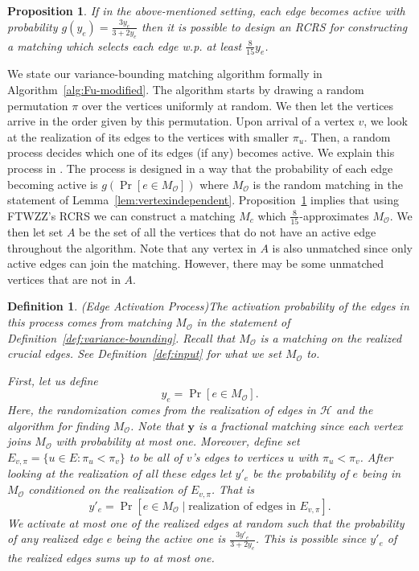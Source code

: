 \documentclass[letterpaper,11pt]{article}
\newcommand{\mc}[1]{\ensuremath{\mathcal{#1}}}
\newtheorem{proposition}[lemma]{Proposition}
\newtheorem{definition}[lemma]{Definition}
\renewcommand{\mc}[1]{\ensuremath{\mathcal{#1}}}
\begin{document}
\begin{proposition}\label{prop:fu}
   If in the above-mentioned setting, each edge becomes active with probability $g(y_e)=\frac{3y_e}{3+2y_e}$ then it is possible to design an RCRS for constructing a matching which selects each edge w.p. at least $\frac{8}{15}y_e$.
\end{proposition}


We state our variance-bounding matching algorithm formally in Algorithm~\ref{alg:Fu-modified}. The  algorithm starts by drawing a  random permutation $\pi$ over the vertices uniformly at random. We then let the vertices arrive in the order given by this permutation. Upon arrival of a vertex $v$, we look at the realization of its edges to the vertices with smaller $\pi_u$. Then, a random process decides which one of its edges (if any) becomes active. We explain  this process in . The process is designed in a way that the probability of each edge becoming active is $g(\Pr[e\in M_{\mc{O}}])$ where $M_{\mc{O}}$ is the random matching in the statement of Lemma~\ref{lem:vertexindependent}. Proposition~\ref{prop:fu} implies that using  FTWZZ's RCRS we can  construct a matching $M_c$ which $\frac{8}{15}$-approximates  $M_{\mc{O}}$. We then let set $A$ be the set of all the vertices that do not have an active edge throughout the algorithm. Note that any vertex in $A$ is also unmatched since only active edges can join  the matching. However, there may be some unmatched vertices that are not in $A$.

\begin{definition}(Edge Activation Process)\label{def:Fuv} The activation probability of the edges in this process comes from matching $M_{\mc{O}}$  in the statement of 
Definition~\ref{def:variance-bounding}. Recall that $M_{\mc{O}}$ is a matching on the realized crucial edges. See Definition~\ref{def:input} for what we set $M_{\mc{O}}$ to.

First, let us define 
\begin{equation}\label{eq:yvjkrgjrg}
    y_e= \Pr[e\in M_{\mc{O}}].
\end{equation}
Here, the randomization comes from the realization of edges in $\mathcal{H}$ and the algorithm for finding $M_\mc{O}$. Note that $\bm{y}$ is a fractional matching since each vertex  joins $M_{\mc{O}}$ with probability at most one. Moreover, define set $E_{v, \pi} = \{u \in E : \pi_u < \pi_v\}$ to be all of $v$'s  edges to vertices $u$ with $\pi_u < \pi_v$. After looking  at the realization of all these edges let $y'_e$ be the probability of $e$ being in $M_{\mc{O}}$ conditioned on the realization of $E_{v, \pi}$. That is 
\begin{equation}\label{eq:kjrkjfr}
    y'_e= \Pr[e\in M_{\mc{O}} \mid  \text{realization of edges  in } E_{v, \pi}].
\end{equation}
We activate at most one of the realized edges at random such that the probability of any realized edge $e$ being the active one is  
 $\frac{3y'_e}{3 + 2y_e}$. This is possible since $y'_e$ of the realized edges sums up to at most one.
\end{definition}
\end{document}
